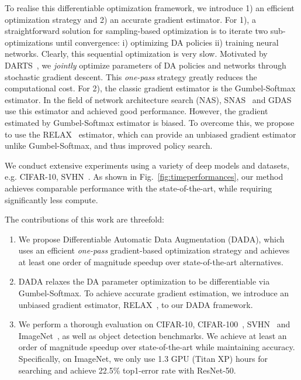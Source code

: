 \documentclass[runningheads]{llncs}
\begin{document}
To realise this differentiable optimization framework, we introduce 1) an efficient optimization strategy and 2) an accurate gradient estimator. 
For 1), a straightforward solution for sampling-based optimization is to iterate two sub-optimizations until convergence: i) optimizing  DA policies ii) training neural networks. Clearly, this sequential  optimization is very slow. Motivated by DARTS~\cite{DBLP:conf/iclr/LiuSY19}, we \emph{jointly} optimize parameters of DA policies and networks through stochastic gradient descent. This \emph{one-pass} strategy greatly reduces the computational cost. For 2), the classic gradient estimator is the Gumbel-Softmax estimator. In the field of network architecture search (NAS), SNAS~\cite{DBLP:conf/iclr/XieZLL19} and GDAS~\cite{Dong_2019_CVPR} use this estimator and achieved good performance. However, the gradient estimated by Gumbel-Softmax estimator is biased. To overcome this, we propose to use the  RELAX~\cite{DBLP:conf/iclr/GrathwohlCWRD18} estimator, which can provide an unbiased gradient estimator unlike Gumbel-Softmax, and thus improved policy search.














We conduct extensive experiments using a variety of deep models and datasets, e.g.  CIFAR-10,  SVHN~\cite{netzer2011reading}. 
As shown in Fig.~\ref{fig:timeperformances}, our method achieves comparable performance with the state-of-the-art, while requiring significantly less compute.  






The contributions of this work are threefold:
\begin{enumerate}
	\item We propose Differentiable Automatic Data Augmentation (DADA), which uses an efficient \emph{one-pass} gradient-based optimization strategy and achieves at least one order of magnitude speedup over state-of-the-art alternatives.
	\item DADA relaxes the  DA  parameter optimization  to be  differentiable via Gumbel-Softmax.  To achieve accurate gradient estimation,  
we introduce an unbiased gradient estimator, RELAX~\cite{DBLP:conf/iclr/GrathwohlCWRD18}, to  our DADA framework. \item We perform a thorough evaluation on CIFAR-10, CIFAR-100~\cite{krizhevsky2009learning}, SVHN~\cite{netzer2011reading} and ImageNet~\cite{ILSVRC15}, as well as object detection benchmarks. We achieve at least an order of magnitude speedup over state-of-the-art while maintaining  accuracy. Specifically, on ImageNet, we only use 1.3 GPU (Titan XP) hours for searching and achieve 22.5\% top1-error rate with ResNet-50.
	
\end{enumerate}
\end{document}
